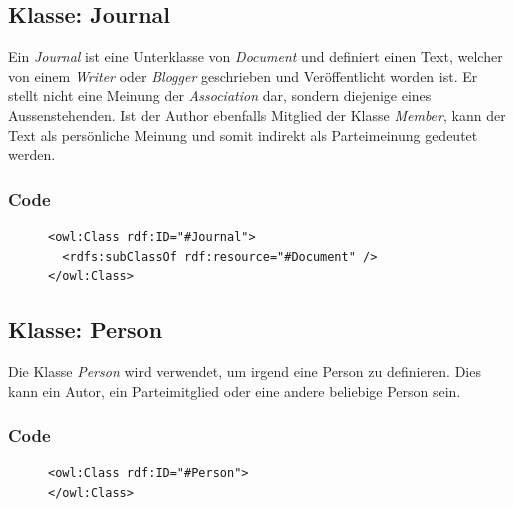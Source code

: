 \documentclass[
    11pt,
    latin1,
    a4paper,
    oneside
]{scrreprt}
\begin{document}
\subsection{Klasse: Journal} \label{sec:class_journal}

Ein \emph{Journal} ist eine Unterklasse von \emph{Document} und definiert einen Text, welcher von einem \emph{Writer} oder \emph{Blogger} geschrieben und Ver\"offentlicht worden ist. Er stellt nicht eine Meinung der \emph{Association} dar, sondern diejenige eines Aussenstehenden. Ist der Author ebenfalls Mitglied der Klasse \emph{Member}, kann der Text als pers\"onliche Meinung und somit indirekt als Parteimeinung gedeutet werden.

\subsubsection{Code} \label{sec:class_journal_code}

\begin{figure}[H]
 \lstset{language=XML}
 \begin{lstlisting}[label=owl:journal,caption={Ein \emph{Journal} ist ein Bericht \"uber eine \emph{Association}, welcher von einer \emph{Organization} herausgegeben wurde}]
<owl:Class rdf:ID="#Journal">
  <rdfs:subClassOf rdf:resource="#Document" />
</owl:Class>
 \end{lstlisting}
\end{figure}

\subsection{Klasse: Person} \label{sec:class_person}

Die Klasse \emph{Person} wird verwendet, um irgend eine Person zu definieren. Dies kann ein Autor, ein Parteimitglied oder eine andere beliebige Person sein.

\subsubsection{Code} \label{sec:class_person_code}

\begin{figure}[H]
 \lstset{language=XML}
 \begin{lstlisting}[label=owl:person,caption={Die Klasse \emph{Person} definiert alle Personen}]
<owl:Class rdf:ID="#Person">
</owl:Class>
 \end{lstlisting}
\end{figure}
\end{document}
